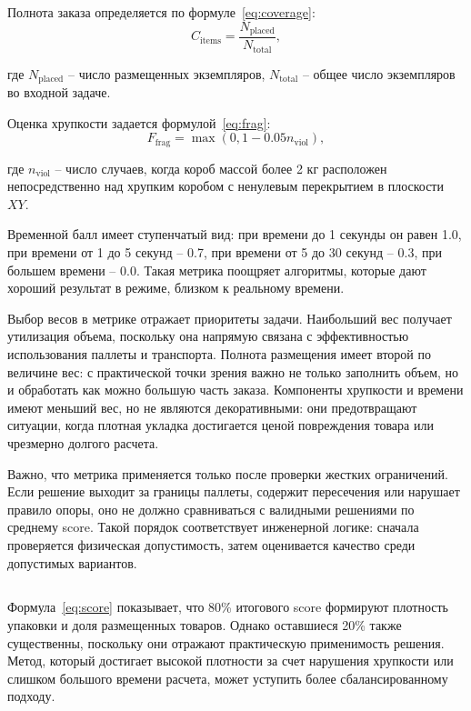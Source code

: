 Полнота заказа определяется по формуле~\eqref{eq:coverage}:
\begin{equation}
C_{\mathrm{items}}=\frac{N_{\mathrm{placed}}}{N_{\mathrm{total}}},
\label{eq:coverage}
\end{equation}
\par\indent
где $N_{\mathrm{placed}}$ -- число размещенных экземпляров, $N_{\mathrm{total}}$ -- общее число экземпляров во входной задаче.

Оценка хрупкости задается формулой~\eqref{eq:frag}:
\begin{equation}
F_{\mathrm{frag}}=\max(0, 1-0.05n_{\mathrm{viol}}),
\label{eq:frag}
\end{equation}
\par\indent
где $n_{\mathrm{viol}}$ -- число случаев, когда короб массой более 2 кг расположен непосредственно над хрупким коробом с ненулевым перекрытием в плоскости $XY$.

Временной балл имеет ступенчатый вид: при времени до 1 секунды он равен 1.0, при времени от 1 до 5 секунд -- 0.7, при времени от 5 до 30 секунд -- 0.3, при большем времени -- 0.0. Такая метрика поощряет алгоритмы, которые дают хороший результат в режиме, близком к реальному времени.

Выбор весов в метрике отражает приоритеты задачи. Наибольший вес получает утилизация объема, поскольку она напрямую связана с эффективностью использования паллеты и транспорта. Полнота размещения имеет второй по величине вес: с практической точки зрения важно не только заполнить объем, но и обработать как можно большую часть заказа. Компоненты хрупкости и времени имеют меньший вес, но не являются декоративными: они предотвращают ситуации, когда плотная укладка достигается ценой повреждения товара или чрезмерно долгого расчета.

Важно, что метрика применяется только после проверки жестких ограничений. Если решение выходит за границы паллеты, содержит пересечения или нарушает правило опоры, оно не должно сравниваться с валидными решениями по среднему score. Такой порядок соответствует инженерной логике: сначала проверяется физическая допустимость, затем оценивается качество среди допустимых вариантов.

\subsection{}

Формула~\eqref{eq:score} показывает, что 80\% итогового score формируют плотность упаковки и доля размещенных товаров. Однако оставшиеся 20\% также существенны, поскольку они отражают практическую применимость решения. Метод, который достигает высокой плотности за счет нарушения хрупкости или слишком большого времени расчета, может уступить более сбалансированному подходу.

